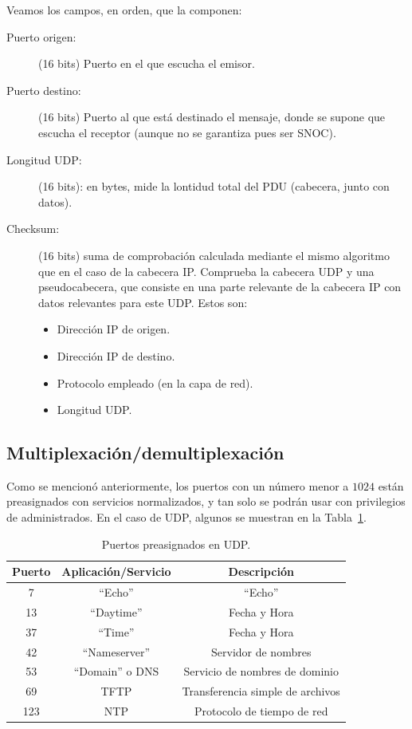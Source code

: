 Veamos los campos, en orden, que la componen:
\begin{description}
    \item [Puerto origen:] (16 bits) Puerto en el que escucha el emisor.
    \item [Puerto destino:] (16 bits) Puerto al que está destinado el mensaje, donde se supone que escucha el receptor (aunque no se garantiza pues ser \acrshort{SNOC}).
    \item [Longitud UDP:] (16 bits): en bytes, mide la lontidud total del \acrshort{PDU} (cabecera, junto con datos).
    \item [Checksum:] (16 bits) suma de comprobación calculada mediante el mismo algoritmo que en el caso de la cabecera \acrshort{IP}. Comprueba la cabecera \acrshort{UDP} y una pseudocabecera, que consiste en una parte relevante de la cabecera \acrshort{IP} con datos relevantes para este \acrshort{UDP}. Estos son:
        \begin{itemize}
            \item Dirección IP de origen.
            \item Dirección IP de destino.
            \item Protocolo empleado (en la capa de red).
            \item Longitud UDP.
        \end{itemize}
\end{description}

\subsection{Multiplexación/demultiplexación}

Como se mencionó anteriormente, los puertos con un número menor a $1024$ están preasignados con servicios normalizados, y tan solo se podrán usar con privilegios de administrados. En el caso de \acrshort{UDP}, algunos se muestran en la Tabla~\ref{tab:puertos-udp}.
\begin{table}
    \centering
    \begin{tabular}{|c|c|c|}
        \hline Puerto & Aplicación/Servicio & Descripción\\\hline
        7 & ``Echo'' & ``Echo''\\
        13 & ``Daytime'' & Fecha y Hora\\
        37 & ``Time'' & Fecha y Hora\\
        42 & ``Nameserver'' & Servidor de nombres\\
        53 & ``Domain'' o \acrshort{DNS}  & Servicio de nombres de dominio\\
        69 & \acrshort{TFTP} & Transferencia simple de archivos\\
        123 & \acrshort{NTP} & Protocolo de tiempo de red\\\hline
    \end{tabular}
    \caption{Puertos preasignados en \acrshort{UDP}.}
    \label{tab:puertos-udp}
\end{table}

